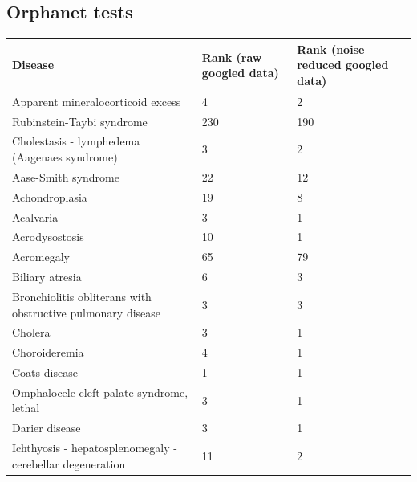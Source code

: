 \documentclass[10pt,letterpaper,final]{article}
\begin{document}
\subsection{Orphanet tests}
\begin{center}
\begin{small}
	\begin{tabular}{|p{3.5cm}|p{1.8cm}|p{1.8cm}|}
	\hline
	\textbf{Disease}  & \textbf{Rank (raw googled data)} & \textbf{Rank (noise reduced googled data)} \\
    \hline\hline
    Apparent mineralocorticoid excess & 4 & 2\\
    \hline
    Rubinstein-Taybi syndrome  & 230 & 190\\
    \hline
    Cholestasis - lymphedema  (Aagenaes syndrome) & 3 & 2\\
    \hline
    Aase-Smith syndrome  & 22 & 12\\
    \hline
    Achondroplasia  & 19 & 8\\
    \hline
    Acalvaria    & 3 & 1\\
    \hline
    Acrodysostosis  & 10 & 1\\
    \hline
    Acromegaly & 65 & 79\\
    \hline
    Biliary atresia  & 6 & 3\\
    \hline
    Bronchiolitis obliterans with obstructive pulmonary disease  & 3 & 3\\
    \hline
    Cholera  & 3 & 1\\
    \hline
    Choroideremia  & 4 & 1\\
    \hline
    Coats disease  & 1 & 1\\
    \hline
    Omphalocele-cleft palate syndrome, lethal  & 3 & 1\\
    \hline
    Darier disease  & 3 & 1\\
    \hline
    Ichthyosis - hepatosplenomegaly - cerebellar degeneration  & 11 & 2\\
    \hline
    \end{tabular}
\label{tab:results_orphanet}
\end{small}
\end{center}
\end{document}
